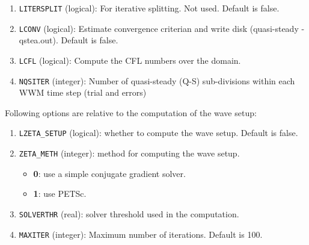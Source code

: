 \documentclass[12pt]{amsart}
\begin{document}
\begin{enumerate}
  
  
  

\item {\tt LITERSPLIT} (logical): For iterative splitting. Not used. Default is false.
\item {\tt LCONV} (logical): Estimate convergence criterian and write disk (quasi-steady - qstea.out). Default is false.
\item {\tt LCFL} (logical): Compute the CFL numbers over the domain.
\item {\tt NQSITER} (integer): Number of quasi-steady (Q-S) sub-divisions within each WWM time step (trial and errors)
\end{enumerate}


Following options are relative to the computation of the wave setup:

\begin{enumerate}
\item {\tt LZETA\_SETUP} (logical): whether to compute the wave setup. Default is false.
\item {\tt ZETA\_METH} (integer): method for computing the wave setup.
  \begin{itemize}
  \item {\bf 0}: use a simple conjugate gradient solver.
  \item {\bf 1}: use PETSc.
  \end{itemize}
\item {\tt SOLVERTHR} (real): solver threshold used in the computation.
\item {\tt MAXITER} (integer): Maximum number of iterations. Default is 100.
\end{enumerate}
\end{document}
